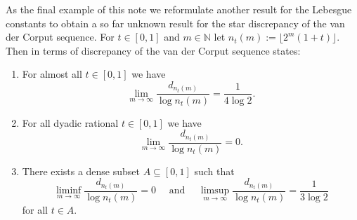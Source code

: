 \documentclass[12pt]{article}
\begin{document}
As the final example of this note we reformulate another result for the Lebesgue constants to obtain a so far unknown result for the star discrepancy of the van der Corput sequence. For $t \in [0,1]$ and $m \in \mathbb{N}$ let $n_t(m):= \lfloor 2^m(1+t)\rfloor$. Then \cite[Theorem~5]{AS2} in terms of discrepancy of the van der Corput sequence states:
\begin{enumerate}
\item For almost all $t \in [0,1]$ we have $$\lim_{m \rightarrow \infty} \frac{d_{n_t(m)}}{\log n_t(m) }=\frac{1}{4 \log 2}.$$
\item For all dyadic rational $t \in [0,1]$ we have $$\lim_{m \rightarrow \infty} \frac{d_{n_t(m)}}{\log n_t(m)}=0.$$
\item There exists a dense subset $A \subseteq [0,1]$ such that $$\liminf_{m \rightarrow \infty} \frac{d_{n_t(m)}}{\log n_t(m)}=0 \quad \mbox{ and }\quad \limsup_{m \rightarrow \infty} \frac{d_{n_t(m)}}{\log n_t(m)}=\frac{1}{3 \log 2}$$ for all $t \in A$.
\end{enumerate}
\end{document}
